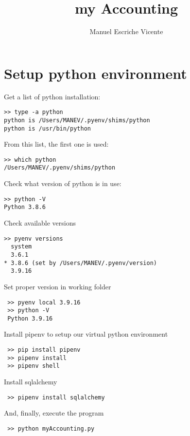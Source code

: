 \documentclass[12pt, a4paper]{article}
\title{my Accounting}
\author{Manuel Escriche Vicente}
\begin{document}
\maketitle
\begin{abstract}

\end{abstract}
\tableofcontents
\newpage

\section{Setup python environment}
Get a list of python installation:
\begin{verbatim}
>> type -a python
python is /Users/MANEV/.pyenv/shims/python
python is /usr/bin/python
\end{verbatim}
From this list, the first one is used:
\begin{verbatim}
>> which python
/Users/MANEV/.pyenv/shims/python
\end{verbatim}
Check what version of python is in use:
\begin{verbatim}
>> python -V
Python 3.8.6
\end{verbatim}
Check available versions
\begin{verbatim}
>> pyenv versions
  system
  3.6.1
* 3.8.6 (set by /Users/MANEV/.pyenv/version)
  3.9.16
\end{verbatim}
Set proper version in working folder
\begin{verbatim}
 >> pyenv local 3.9.16
 >> python -V
 Python 3.9.16
 \end{verbatim}
 Install pipenv to setup our virtual python environment
 \begin{verbatim}
 >> pip install pipenv
 >> pipenv install
 >> pipenv shell
 \end{verbatim}
 Install sqlalchemy
 \begin{verbatim}
 >> pipenv install sqlalchemy
 \end{verbatim}
 And, finally, execute the program
 \begin{verbatim}
 >> python myAccounting.py
 \end{verbatim} 
 
\end{document}
